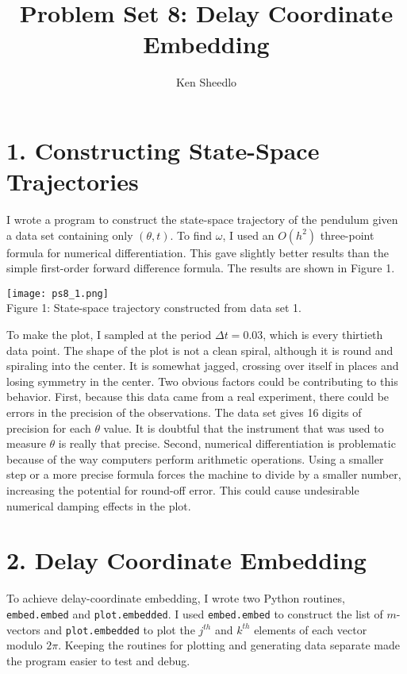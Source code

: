 \documentclass[12pt, letterpaper]{article}
\title{Problem Set 8: Delay Coordinate Embedding}
\author{Ken Sheedlo}
\begin{document}
\maketitle{}

\section*{1. Constructing State-Space Trajectories}

I wrote a program to construct the state-space trajectory of the pendulum given 
a data set containing only $(\theta, t)$. To find $\omega$, I used an $O(h^2)$
three-point formula for numerical differentiation. This gave slightly better
results than the simple first-order forward difference formula. The results are
shown in Figure 1.

\begin{center}
\texttt{[image: ps8\_1.png]}
\\
Figure 1: State-space trajectory constructed from data set 1.
\end{center}

To make the plot, I sampled at the period $\Delta t = 0.03$, which is every 
thirtieth data point. The shape of the plot is not a clean spiral, although it
is round and spiraling into the center. It is somewhat jagged, crossing over
itself in places and losing symmetry in the center. Two obvious factors could
be contributing to this behavior. First, because this data came from a real 
experiment, there could be errors in the precision of the observations. The data 
set gives 16 digits of precision for each $\theta$ value. It is doubtful that the 
instrument that was used to measure $\theta$ is really that precise. Second, 
numerical differentiation is problematic because of the way computers perform
arithmetic operations. Using a smaller step or a more precise formula forces the
machine to divide by a smaller number, increasing the potential for round-off
error. This could cause undesirable numerical damping effects in the plot.

\section*{2. Delay Coordinate Embedding}

To achieve delay-coordinate embedding, I wrote two Python routines, 
\texttt{embed.embed} and \texttt{plot.embedded}. I used \texttt{embed.embed} to
construct the list of $m$-vectors and \texttt{plot.embedded} to plot the $j^{th}$
and $k^{th}$ elements of each vector modulo $2\pi$. Keeping the routines for 
plotting and generating data separate made the program easier to test and debug.
\end{document}
